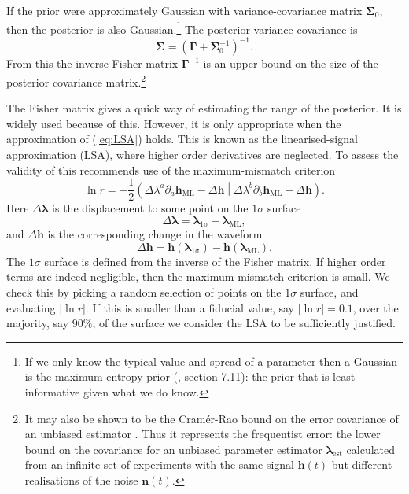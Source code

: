 \documentclass[useAMS,usedcolumn,usegraphicx,usenatbib]{mn2e}
\newcommand{\eqnref}[1]{(\ref{eq:#1})}
\newcommand{\sub}[1]{\ensuremath{_\mathrm{#1}}}
\newcommand{\recip}[1]{\ensuremath{\frac{1}{#1}}}
\newcommand{\innerprod}[2]{\ensuremath{\left({#1}\middle|{#2}\right)}}
\begin{document}
If the prior were approximately Gaussian with variance-covariance matrix $\boldsymbol{\Sigma}_0$, then the posterior is also Gaussian.\footnote{If we only know the typical value and spread of a parameter then a Gaussian is the maximum entropy prior (\citealt{Jaynes2003}, section 7.11): the prior that is least informative given what we do know.} The posterior variance-covariance is \citep{Cutler1994, Vallisneri2008}
\begin{equation}
\boldsymbol{\Sigma} = \left(\boldsymbol{\Gamma} + \boldsymbol{\Sigma}_0^{-1}\right)^{-1}.
\label{eq:Posterior_variance}
\end{equation}
From this the inverse Fisher matrix $\boldsymbol{\Gamma}^{-1}$ is an upper bound on the size of the posterior covariance matrix.\footnote{It may also be shown to be the Cram\'{e}r-Rao bound on the error covariance of an unbiased estimator \citep{Cutler1994, Vallisneri2008}. Thus it represents the frequentist error: the lower bound on the covariance for an unbiased parameter estimator $\boldsymbol{\lambda}\sub{est}$ calculated from an infinite set of experiments with the same signal $\boldsymbol{h}(t)$ but different realisations of the noise $\boldsymbol{n}(t)$.}

The Fisher matrix gives a quick way of estimating the range of the posterior. It is widely used because of this. However, it is only appropriate when the approximation of \eqnref{LSA} holds. This is known as the linearised-signal approximation (LSA), where higher order derivatives are neglected. To assess the validity of this \citet{Vallisneri2008} recommends use of the maximum-mismatch criterion
\begin{equation}
\ln r = -\recip{2}\innerprod{\Delta\lambda^a\partial_a\boldsymbol{h}\sub{ML} - \Delta\boldsymbol{h}}{\Delta\lambda^b\partial_b\boldsymbol{h}\sub{ML} - \Delta\boldsymbol{h}}.
\end{equation}
Here $\Delta \boldsymbol{\lambda}$ is the displacement to some point on the $1\sigma$ surface
\begin{equation}
\Delta \boldsymbol{\lambda} = \boldsymbol{\lambda}\sub{1\sigma} - \boldsymbol{\lambda}\sub{ML},
\end{equation}
and $\Delta \boldsymbol{h}$ is the corresponding change in the waveform
\begin{equation}
\Delta \boldsymbol{h} = \boldsymbol{h}(\boldsymbol{\lambda}\sub{1\sigma}) - \boldsymbol{h}(\boldsymbol{\lambda}\sub{ML}).
\end{equation}
The $1\sigma$ surface is defined from the inverse of the Fisher matrix. If higher order terms are indeed negligible, then the maximum-mismatch criterion is small. We check this by picking a random selection of points on the $1\sigma$ surface, and evaluating $|\ln r|$. If this is smaller than a fiducial value, say $|\ln r| = 0.1$, over the majority, say $90\%$, of the surface we consider the LSA to be sufficiently justified.
\end{document}
